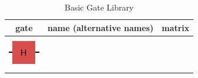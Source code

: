 \documentclass[conference]{IEEEtran}
\begin{document}
\begin{appendices}
\begin{table}[!h]
\begin{center}
    \caption{Basic Gate Library}
    \label{table:gatelib}
\begin{tabular}{ccc}
    \toprule
    gate & name (alternative names) & matrix \\
    \midrule

    \begin{minipage}[c]{1cm}
        \includegraphics{img/gate_h.png}
    \end{minipage}


\end{tabular}
\end{center}
\end{table}
\end{appendices}
\end{document}
